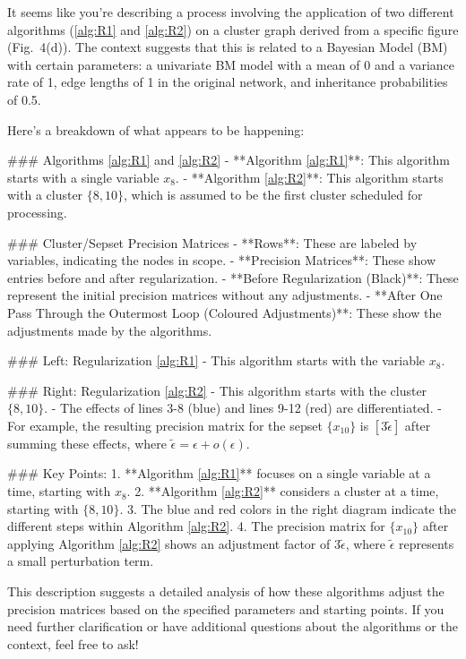 It seems like you're describing a process involving the application of two different algorithms (\ref{alg:R1} and \ref{alg:R2}) on a cluster graph derived from a specific figure (Fig.~4(d)). The context suggests that this is related to a Bayesian Model (BM) with certain parameters: a univariate BM model with a mean of 0 and a variance rate of 1, edge lengths of 1 in the original network, and inheritance probabilities of 0.5.

Here's a breakdown of what appears to be happening:

### Algorithms \ref{alg:R1} and \ref{alg:R2}
- **Algorithm \ref{alg:R1}**: This algorithm starts with a single variable \( x_8 \).
- **Algorithm \ref{alg:R2}**: This algorithm starts with a cluster \(\{8, 10\}\), which is assumed to be the first cluster scheduled for processing.

### Cluster/Sepset Precision Matrices
- **Rows**: These are labeled by variables, indicating the nodes in scope.
- **Precision Matrices**: These show entries before and after regularization.
- **Before Regularization (Black)**: These represent the initial precision matrices without any adjustments.
- **After One Pass Through the Outermost Loop (Coloured Adjustments)**: These show the adjustments made by the algorithms.

### Left: Regularization \ref{alg:R1}
- This algorithm starts with the variable \( x_8 \).

### Right: Regularization \ref{alg:R2}
- This algorithm starts with the cluster \(\{8, 10\}\).
- The effects of lines 3-8 (blue) and lines 9-12 (red) are differentiated.
- For example, the resulting precision matrix for the sepset \(\{x_{10}\}\) is \([3\tilde{\epsilon}]\) after summing these effects, where \(\tilde{\epsilon} = \epsilon + o(\epsilon)\).

### Key Points:
1. **Algorithm \ref{alg:R1}** focuses on a single variable at a time, starting with \( x_8 \).
2. **Algorithm \ref{alg:R2}** considers a cluster at a time, starting with \(\{8, 10\}\).
3. The blue and red colors in the right diagram indicate the different steps within Algorithm \ref{alg:R2}.
4. The precision matrix for \(\{x_{10}\}\) after applying Algorithm \ref{alg:R2} shows an adjustment factor of \(3\tilde{\epsilon}\), where \(\tilde{\epsilon}\) represents a small perturbation term.

This description suggests a detailed analysis of how these algorithms adjust the precision matrices based on the specified parameters and starting points. If you need further clarification or have additional questions about the algorithms or the context, feel free to ask!